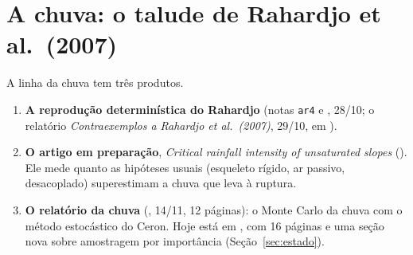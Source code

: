 \section{A chuva: o talude de Rahardjo et al.\ (2007)}
\label{sec:chuva}

A linha da chuva tem três produtos.
\begin{enumerate}
  \item \textbf{A reprodução determinística do Rahardjo} (notas \texttt{ar4} e , 28/10; o
    relatório \emph{Contraexemplos a Rahardjo et al.\ (2007)}, 29/10, em ).
  \item \textbf{O artigo em preparação}, \emph{Critical rainfall intensity of unsaturated slopes}
    (). Ele mede quanto as hipóteses usuais (esqueleto rígido, ar passivo,
    desacoplado) superestimam a chuva que leva à ruptura.
  \item \textbf{O relatório da chuva} (, 14/11, 12 páginas): o Monte Carlo da
    chuva com o método estocástico do Ceron. Hoje está em
    , com 16 páginas e uma seção nova sobre amostragem por
    importância (Seção~\ref{sec:estado}).
\end{enumerate}

